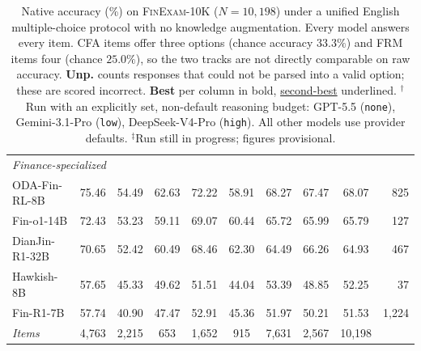 \begin{table}[t]
\begin{tabular}{l ccc cc cc c r}
\midrule
\multicolumn{10}{l}{\textit{Finance-specialized}} \\
ODA-Fin-RL-8B & 75.46 & 54.49 & 62.63 & 72.22 & 58.91 & 68.27 & 67.47 & 68.07 & 825 \\
Fin-o1-14B & 72.43 & 53.23 & 59.11 & 69.07 & 60.44 & 65.72 & 65.99 & 65.79 & 127 \\
DianJin-R1-32B & 70.65 & 52.42 & 60.49 & 68.46 & 62.30 & 64.49 & 66.26 & 64.93 & 467 \\
Hawkish-8B & 57.65 & 45.33 & 49.62 & 51.51 & 44.04 & 53.39 & 48.85 & 52.25 & 37 \\
Fin-R1-7B & 57.74 & 40.90 & 47.47 & 52.91 & 45.36 & 51.97 & 50.21 & 51.53 & 1,224 \\
\midrule
\textit{Items} & 4{,}763 & 2{,}215 & 653 & 1{,}652 & 915 & 7{,}631 & 2{,}567 & 10{,}198 & \\
\bottomrule
\end{tabular}
\caption{Native accuracy (\%) on \textsc{FinExam-10K} ($N=10{,}198$) under a unified English multiple-choice protocol with no knowledge augmentation. Every model answers every item. CFA items offer three options (chance accuracy $33.3\%$) and FRM items four (chance $25.0\%$), so the two tracks are not directly comparable on raw accuracy. \textbf{Unp.} counts responses that could not be parsed into a valid option; these are scored incorrect. \textbf{Best} per column in bold, \underline{second-best} underlined. $^{\dagger}$Run with an explicitly set, non-default reasoning budget: GPT-5.5 (\texttt{none}), Gemini-3.1-Pro (\texttt{low}), DeepSeek-V4-Pro (\texttt{high}). All other models use provider defaults. $^{\ddagger}$Run still in progress; figures provisional.}
\label{tab:leaderboard}
\end{table}
